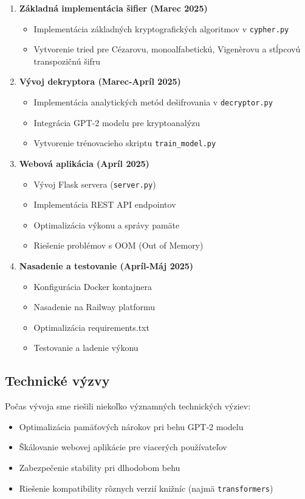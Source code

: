 \documentclass[12pt,a4paper]{article}
\begin{document}
\begin{enumerate}
    \item \textbf{Základná implementácia šifier (Marec 2025)}
    \begin{itemize}
        \item Implementácia základných kryptografických algoritmov v \texttt{cypher.py}
        \item Vytvorenie tried pre Cézarovu, monoalfabetickú, Vigenèrovu a stĺpcovú transpozičnú šifru
    \end{itemize}

    \item \textbf{Vývoj dekryptora (Marec-Apríl 2025)}
    \begin{itemize}
        \item Implementácia analytických metód dešifrovania v \texttt{decryptor.py}
        \item Integrácia GPT-2 modelu pre kryptoanalýzu
        \item Vytvorenie trénovacieho skriptu \texttt{train\_model.py}
    \end{itemize}

    \item \textbf{Webová aplikácia (Apríl 2025)}
    \begin{itemize}
        \item Vývoj Flask servera (\texttt{server.py})
        \item Implementácia REST API endpointov
        \item Optimalizácia výkonu a správy pamäte
        \item Riešenie problémov s OOM (Out of Memory)
    \end{itemize}

    \item \textbf{Nasadenie a testovanie (Apríl-Máj 2025)}
    \begin{itemize}
        \item Konfigurácia Docker kontajnera
        \item Nasadenie na Railway platformu
        \item Optimalizácia requirements.txt
        \item Testovanie a ladenie výkonu
    \end{itemize}
\end{enumerate}

\subsection{Technické výzvy}
Počas vývoja sme riešili niekoľko významných technických výziev:
\begin{itemize}
    \item Optimalizácia pamäťových nárokov pri behu GPT-2 modelu
    \item Škálovanie webovej aplikácie pre viacerých používateľov
    \item Zabezpečenie stability pri dlhodobom behu
    \item Riešenie kompatibility rôznych verzií knižníc (najmä \texttt{transformers})
\end{itemize}
\end{document}
